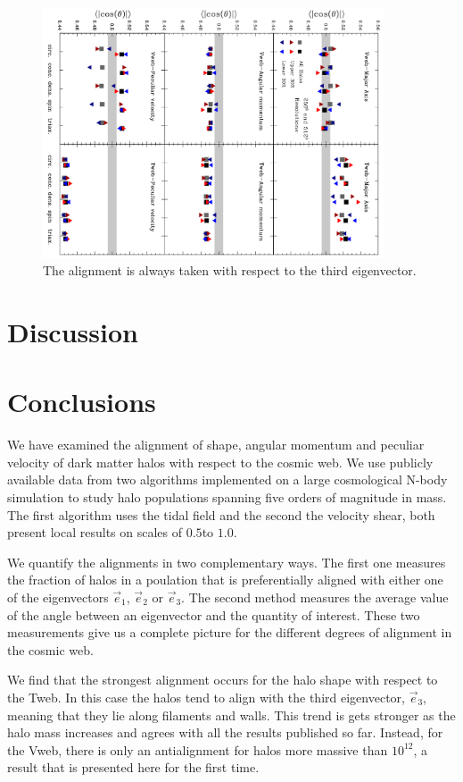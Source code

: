 \documentclass[useAMS,usenatbib]{mn2e}
\newcommand{\hMpc}{{\ifmmode{h^{-1}{\rm Mpc}}\else{$h^{-1}$Mpc }\fi}}
\newcommand{\hMsun}{{\ifmmode{h^{-1}{\rm
        {M_{\odot}}}}\else{$h^{-1}{\rm{M_{\odot}}}$~}\fi}}
\begin{document}
\begin{figure}
\includegraphics[width=0.90\textwidth,angle=90]{Fig6.pdf}
\caption{The alignment is always taken with respect to the third eigenvector.}
\end{figure}
\section{Discussion}
\label{sec:discussion}



\section{Conclusions}
\label{sec:conclusions}

We have examined the alignment of shape, angular momentum and peculiar
velocity of dark matter halos with respect to the cosmic web. We use
publicly available data from two algorithms implemented on a large
cosmological N-body simulation to study halo populations spanning five
orders of magnitude in mass. The first algorithm uses the tidal field
and the second the velocity shear, both present local results on
scales of $0.5$\hMpc to $1.0$\hMpc.  

We quantify the alignments in two complementary ways. The first one
measures the fraction of halos in a poulation that is preferentially
aligned with either one of the eigenvectors $\vec{e}_1$, $\vec{e}_2$
or $\vec{e}_3$. The second method measures the average value of the
angle between an eigenvector and the quantity of interest. These two
measurements give us a complete picture for the different degrees of
alignment in the cosmic web. 

We find that the strongest alignment occurs for the halo shape with
respect to the Tweb. In this case the halos tend to align with the
third eigenvector, $\vec{e}_3$, meaning that they lie along filaments
and walls. This trend is gets stronger as the halo mass
increases and agrees with all the results published so far. Instead,
for the Vweb, there is only an antialignment for halos more massive
than $10^{12}$\hMsun, a result that is presented here for the first
time.  
\end{document}

